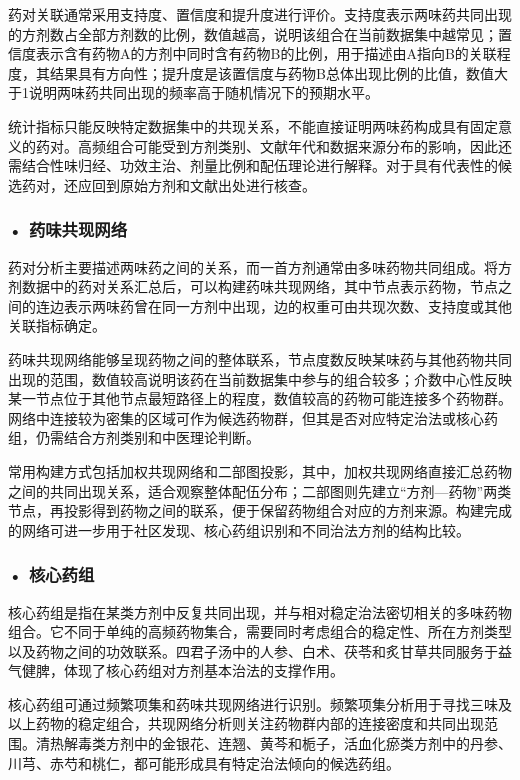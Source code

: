 药对关联通常采用支持度、置信度和提升度进行评价。支持度表示两味药共同出现的方剂数占全部方剂数的比例，数值越高，说明该组合在当前数据集中越常见；置信度表示含有药物A的方剂中同时含有药物B的比例，用于描述由A指向B的关联程度，其结果具有方向性；提升度是该置信度与药物B总体出现比例的比值，数值大于1说明两味药共同出现的频率高于随机情况下的预期水平。

统计指标只能反映特定数据集中的共现关系，不能直接证明两味药构成具有固定意义的药对。高频组合可能受到方剂类别、文献年代和数据来源分布的影响，因此还需结合性味归经、功效主治、剂量比例和配伍理论进行解释。对于具有代表性的候选药对，还应回到原始方剂和文献出处进行核查。

\subsubsection*{\textbf{• 药味共现网络}}

药对分析主要描述两味药之间的关系，而一首方剂通常由多味药物共同组成。将方剂数据中的药对关系汇总后，可以构建药味共现网络，其中节点表示药物，节点之间的连边表示两味药曾在同一方剂中出现，边的权重可由共现次数、支持度或其他关联指标确定。

药味共现网络能够呈现药物之间的整体联系，节点度数反映某味药与其他药物共同出现的范围，数值较高说明该药在当前数据集中参与的组合较多；介数中心性反映某一节点位于其他节点最短路径上的程度，数值较高的药物可能连接多个药物群。网络中连接较为密集的区域可作为候选药物群，但其是否对应特定治法或核心药组，仍需结合方剂类别和中医理论判断。

常用构建方式包括加权共现网络和二部图投影，其中，加权共现网络直接汇总药物之间的共同出现关系，适合观察整体配伍分布；二部图则先建立“方剂—药物”两类节点，再投影得到药物之间的联系，便于保留药物组合对应的方剂来源。构建完成的网络可进一步用于社区发现、核心药组识别和不同治法方剂的结构比较。


\subsubsection*{\textbf{• 核心药组}}

核心药组是指在某类方剂中反复共同出现，并与相对稳定治法密切相关的多味药物组合。它不同于单纯的高频药物集合，需要同时考虑组合的稳定性、所在方剂类型以及药物之间的功效联系。四君子汤中的人参、白术、茯苓和炙甘草共同服务于益气健脾，体现了核心药组对方剂基本治法的支撑作用。

核心药组可通过频繁项集和药味共现网络进行识别。频繁项集分析用于寻找三味及以上药物的稳定组合，共现网络分析则关注药物群内部的连接密度和共同出现范围。清热解毒类方剂中的金银花、连翘、黄芩和栀子，活血化瘀类方剂中的丹参、川芎、赤芍和桃仁，都可能形成具有特定治法倾向的候选药组。

